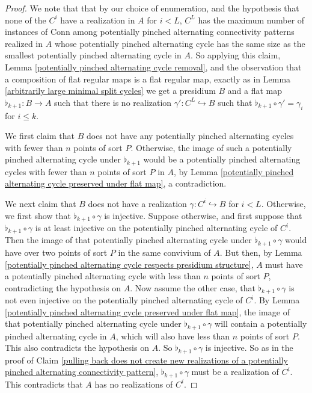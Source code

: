 \documentclass{amsart}
\theoremstyle{definition}
\theoremstyle{remark}
\numberwithin{equation}{section}
\begin{document}
\begin{proof}
We note that that by our choice of enumeration, and the hypothesis that none of the $C^{i}$ have a realization in $A$ for $i < L$, $C^{L}$ has the maximum number of instances of $\mathrm{Conn}$ among potentially pinched alternating connectivity patterns realized in $A$ whose potentially pinched alternating cycle has the same size as the smallest potentially pinched alternating cycle in $A$.
So applying this claim, Lemma \ref{potentially pinched alternating cycle removal}, and the observation that a composition of flat regular maps is a flat regular map, exactly as in Lemma \ref{arbitrarily large minimal split cycles} we get a presidium $B$ and a flat map $\flat_{k+1}: B \to A$ such that there is no realization $\gamma': C^{L} \hookrightarrow B$ such that $\flat_{k+1} \circ \gamma' = \gamma_{i}$ for $i \leq k$. 

We first claim that $B$ does not have any potentially pinched alternating cycles with fewer than $n$ points of sort $P$. Otherwise, the image of such a potentially pinched alternating cycle under $\flat_{k+1}$ would be a potentially pinched alternating cycles with fewer than $n$ points of sort $P$ in $A$, by Lemma \ref{potentially pinched alternating cycle preserved under flat map}, a contradiction. 

We next claim that $B$ does not have a realization $\gamma: C^{i} \hookrightarrow B$ for $i < L$. Otherwise, we first show that $\flat_{k+1} \circ \gamma$ is injective. Suppose otherwise, and first suppose that $\flat_{k+1} \circ \gamma$ is at least injective on the potentially pinched alternating cycle of $C^{i}$. Then the image of that potentially pinched alternating cycle under $\flat_{k+1} \circ \gamma$ would have over two points of sort $P$ in the same convivium of $A$. But then, by Lemma \ref{potentially pinched alternating cycle respects presidium structure}, $A$ must have a potentially pinched alternating cycle with less than $n$ points of sort $P$, contradicting the hypothesis on $A$. Now assume the other case, that  $\flat_{k+1} \circ \gamma$ is not even injective on the potentially pinched alternating cycle of $C^{i}$. By Lemma \ref{potentially pinched alternating cycle preserved under flat map}, the image  of that potentially pinched alternating cycle under $\flat_{k+1} \circ \gamma$ will contain a potentially pinched alternating cycle in $A$, which will also have less than $n$ points of sort $P$. This also contradicts the hypothesis on $A$. So $\flat_{k+1} \circ \gamma$ is injective. So as in the proof of Claim \ref{pulling back does not create new realizations of a potentially pinched alternating connectivity pattern}, $\flat_{k+1} \circ \gamma$ must be a realization of $C^{i}$. This contradicts that $A$ has no realizations of $C^{i}$.


\end{proof}
\end{document}
